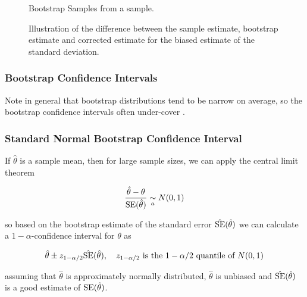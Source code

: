 \begin{figure}[!htb]
    \centering
    
    \caption{Bootstrap Samples from a sample.}
    \label{fig:bootstrap_samples}
\end{figure}

\begin{figure}[!htb]
    \centering
    
    \caption{Illustration of the difference between the sample estimate, bootstrap estimate and corrected estimate for the biased estimate of the standard deviation.}
    \label{fig:boots_corr}
\end{figure}

\subsubsection{Bootstrap Confidence Intervals\skipthis}
Note in general that bootstrap distributions tend to be narrow on average, so the bootstrap confidence intervals often under-cover \citep{tim15}.


\subsubsection{Standard Normal Bootstrap Confidence Interval}
If $\hat{\theta}$ is a sample mean, then for large sample sizes, we can apply the central limit theorem

\begin{equation}
    \frac{\hat{\theta} - \theta}{\operatorname{SE}(\hat{\theta})} \underset{a}{\sim} N(0,1)
\end{equation}

so based on the bootstrap estimate of the standard error $\hat{\operatorname{SE}}(\hat{\theta})$ we can calculate a $1-\alpha$-confidence interval for $\theta$ as

\begin{equation}
    \hat{\theta} \pm z_{1 - \alpha/2} \hat{\operatorname{SE}}(\hat{\theta}), \quad z_{1 - \alpha/2} \text{ is the } 1 - \alpha/2 \text{ quantile of } N(0,1)
\end{equation}

assuming that $\hat{\theta}$ is approximately normally distributed, $\hat{\theta}$ is unbiased and $\hat{\operatorname{SE}}(\hat{\theta})$ is a good estimate of $\operatorname{SE}(\hat{\theta})$.

